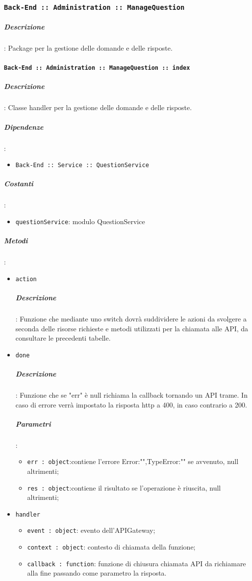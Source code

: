 \documentclass[../DefinizioneDiProdotto_v3.0.0.tex]{subfiles}
\begin{document}
\subsubsection{\texttt{Back-End :: Administration :: ManageQuestion}}
\subparagraph{Descrizione}: Package per la gestione delle domande e delle risposte.

\paragraph{\texttt{Back-End :: Administration :: ManageQuestion :: index}}
\subparagraph{Descrizione}: Classe handler per la gestione delle domande e delle risposte.
\subparagraph{Dipendenze}:
\begin{itemize}
	\item \texttt{Back-End :: Service :: QuestionService}
\end{itemize}
\subparagraph{Costanti}:
\begin{itemize}
	\item \texttt{questionService}: modulo QuestionService
\end{itemize}
\subparagraph{Metodi}:
\begin{itemize}
	\item \texttt{action}
	      \subparagraph{Descrizione}: Funzione che mediante uno switch dovrà suddividere le azioni da svolgere a seconda delle risorse richieste e metodi utilizzati per la chiamata alle API, da consultare le precedenti tabelle.
	\item \texttt{done}
	      \subparagraph{Descrizione}: Funzione che se "err" è null richiama la callback tornando un API trame. In caso di errore verrà impostato la risposta http a 400, in caso contrario a 200.
	      \subparagraph{Parametri}:
	      \begin{itemize}
	      	\item \texttt{err : object}:contiene l'errore {Error:"",TypeError:""} se avvenuto, null altrimenti;
	      	\item \texttt{res : object}:contiene il risultato se l'operazione è riuscita, null altrimenti;
	      \end{itemize}
	\item \texttt{handler}
	      \begin{itemize}
	      	\item \texttt{event : object}: evento dell'APIGateway;
	      	\item \texttt{context : object}: contesto di chiamata della funzione;
	      	\item \texttt{callback : function}: funzione di chiusura chiamata API da richiamare alla fine passando come parametro la risposta.
	      \end{itemize}
\end{itemize}
\end{document}
